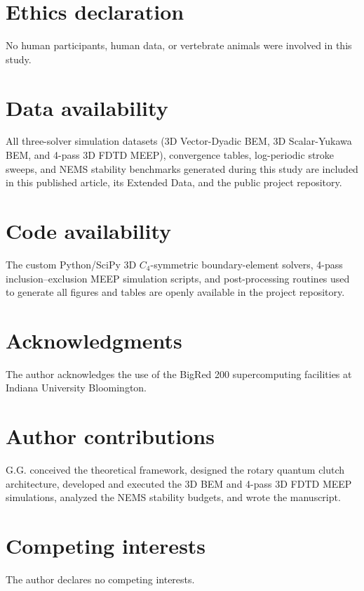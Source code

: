 \documentclass[pdflatex,sn-nature]{sn-jnl}
\begin{document}
\section*{Ethics declaration}
No human participants, human data, or vertebrate animals were involved in this study.

\section*{Data availability}
All three-solver simulation datasets (3D Vector-Dyadic BEM, 3D Scalar-Yukawa BEM, and 4-pass 3D FDTD MEEP), convergence tables, log-periodic stroke sweeps, and NEMS stability benchmarks generated during this study are included in this published article, its Extended Data, and the public project repository.

\section*{Code availability}
The custom Python/SciPy 3D $C_4$-symmetric boundary-element solvers, 4-pass inclusion--exclusion MEEP simulation scripts, and post-processing routines used to generate all figures and tables are openly available in the project repository.

\section*{Acknowledgments}
The author acknowledges the use of the BigRed 200 supercomputing facilities at Indiana University Bloomington.

\section*{Author contributions}
G.G. conceived the theoretical framework, designed the rotary quantum clutch architecture, developed and executed the 3D BEM and 4-pass 3D FDTD MEEP simulations, analyzed the NEMS stability budgets, and wrote the manuscript.

\section*{Competing interests}
The author declares no competing interests.

% 


\clearpage
\renewcommand{\thefigure}{\arabic{figure}}
\renewcommand{\theHfigure}{ext.\arabic{figure}}
\renewcommand{\figurename}{Extended Data Fig.}
\setcounter{figure}{0}
\renewcommand{\thetable}{\arabic{table}}
\renewcommand{\theHtable}{ext.\arabic{table}}
\renewcommand{\tablename}{Extended Data Table}
\setcounter{table}{0}
\end{document}
